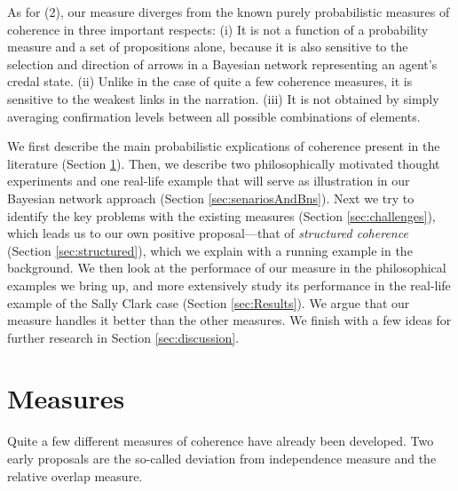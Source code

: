 \documentclass[10pt,]{scrartcl}
\begin{document}
As for (2), our measure diverges from the known purely probabilistic measures of coherence in three important
respects: (i) It is not a function of a probability measure and a set
of propositions alone, because it is also sensitive to the selection and
direction of arrows in a Bayesian network representing an agent's credal state. (ii) Unlike in the case of quite a few coherence measures, it is  sensitive to
 the  weakest links in the narration.
(iii) It is not obtained by simply averaging confirmation levels between all possible combinations of elements.



We first describe the main probabilistic explications of coherence present in the literature (Section \ref{sec:measures}). Then, we describe two philosophically motivated thought experiments and one real-life example that will serve as illustration in our Bayesian network approach (Section \ref{sec:senariosAndBns}). Next we try to identify the key problems with  the existing measures (Section \ref{sec:challenges}), which leads us to our own positive proposal---that of \emph{structured coherence} (Section \ref{sec:structured}), which we explain with a running example in the background. We then look at the performace of our measure in the philosophical examples we bring up, and more extensively study its performance in the  real-life example of the Sally Clark case (Section \ref{sec:Results}). We argue that our measure handles it better than the other measures.  
We finish with a few ideas for further research in Section \ref{sec:discussion}. 







\section{Measures}\label{sec:measures}

Quite a few different measures of coherence have already been developed.  Two early proposals are the so-called deviation from independence measure and  the relative overlap measure.
\end{document}
